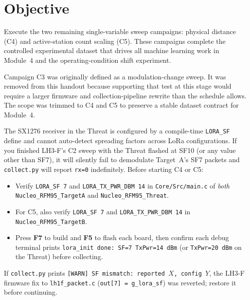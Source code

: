 \documentclass[11pt,letterpaper]{article}
\begin{document}

\section{Objective}
Execute the two remaining single-variable sweep campaigns: physical distance (C4) and active-station count scaling (C5). These campaigns complete the controlled experimental dataset that drives all machine learning work in Module~4 and the operating-condition shift experiment.

\begin{tcolorbox}[infobox={Scope note: Campaign C3 removed}]
Campaign C3 was originally defined as a modulation-change sweep. It was removed from this handout because supporting that test at this stage would require a larger firmware and collection-pipeline rewrite than the schedule allows. The scope was trimmed to C4 and C5 to preserve a stable dataset contract for Module~4.
\end{tcolorbox}

\begin{tcolorbox}[warning={Preflight check before every campaign in this handout}]
The SX1276 receiver in the Threat is configured by a compile-time \texttt{LORA\_SF} define and cannot auto-detect spreading factors across LoRa configurations. If you finished LH3-F's C2 sweep with the Threat flashed at SF10 (or any value other than SF7), it will silently fail to demodulate Target~A's SF7 packets and \texttt{collect.py} will report \texttt{rx=0} indefinitely. Before starting C4 or C5:
\begin{itemize}[leftmargin=1.2em]
	\item Verify \texttt{LORA\_SF 7} and \texttt{LORA\_TX\_PWR\_DBM 14} in \texttt{Core/Src/main.c} of \emph{both} \texttt{Nucleo\_RFM95\_TargetA} and \texttt{Nucleo\_RFM95\_Threat}.
	\item For C5, also verify \texttt{LORA\_SF 7} and \texttt{LORA\_TX\_PWR\_DBM 14} in \texttt{Nucleo\_RFM95\_TargetB}.
	\item Press \textbf{F7} to build and \textbf{F5} to flash each board, then confirm each debug terminal prints \texttt{lora\_init done: SF=7 TxPwr=14 dBm} (or \texttt{TxPwr=20 dBm} on the Threat) before collecting.
\end{itemize}
If \texttt{collect.py} prints \texttt{[WARN] SF mismatch: reported $X$, config $Y$}, the LH3-F firmware fix to \texttt{lh1f\_packet.c} (\texttt{out[7] = g\_lora\_sf}) was reverted; restore it before continuing.
\end{tcolorbox}
\end{document}
